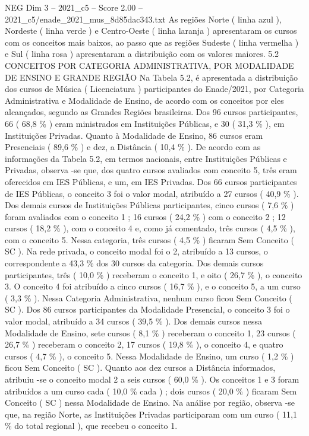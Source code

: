 \begin{textsample}{NEG Dim 3 – 2021\_c5 – Score 2.00 – 2021\_c5/enade\_2021\_mus\_8d85dac343.txt}
As regiões Norte ( linha azul ), Nordeste ( linha verde ) e Centro-Oeste ( linha laranja ) apresentaram os cursos com os conceitos mais baixos, ao passo que as regiões Sudeste ( linha vermelha ) e Sul ( linha rosa ) apresentaram a distribuição com os valores maiores. 5.2 CONCEITOS POR CATEGORIA ADMINISTRATIVA, POR MODALIDADE DE ENSINO E GRANDE REGIÃO Na Tabela 5.2, é apresentada a distribuição dos cursos de Música ( Licenciatura ) participantes do Enade/2021, por Categoria Administrativa e Modalidade de Ensino, de acordo com os conceitos por eles alcançados, segundo as Grandes Regiões brasileiras.
Dos 96 cursos participantes, 66 ( 68,8 \% ) eram ministrados em Instituições Públicas, e 30 ( 31,3 \% ), em Instituições Privadas.
Quanto à Modalidade de Ensino, 86 cursos eram Presenciais ( 89,6 \% ) e dez, a Distância ( 10,4 \% ).
De acordo com as informações da Tabela 5.2, em termos nacionais, entre Instituições Públicas e Privadas, observa -se que, dos quatro cursos avaliados com conceito 5, três eram oferecidos em IES Públicas, e um, em IES Privadas.
Dos 66 cursos participantes de IES Públicas, o conceito 3 foi o valor modal, atribuído a 27 cursos ( 40,9 \% ).
Dos demais cursos de Instituições Públicas participantes, cinco cursos ( 7,6 \% ) foram avaliados com o conceito 1 ; 16 cursos ( 24,2 \% ) com o conceito 2 ; 12 cursos ( 18,2 \% ), com o conceito 4 e, como já comentado, três cursos ( 4,5 \% ), com o conceito 5.
Nessa categoria, três cursos ( 4,5 \% ) ficaram Sem Conceito ( SC ).
Na rede privada, o conceito modal foi o 2, atribuído a 13 cursos, o correspondente a 43,3 \% dos 30 cursos da categoria.
Dos demais cursos participantes, três ( 10,0 \% ) receberam o conceito 1, e oito ( 26,7 \% ), o conceito 3.
O conceito 4 foi atribuído a cinco cursos ( 16,7 \% ), e o conceito 5, a um curso ( 3,3 \% ).
Nessa Categoria Administrativa, nenhum curso ficou Sem Conceito ( SC ).
Dos 86 cursos participantes da Modalidade Presencial, o conceito 3 foi o valor modal, atribuído a 34 cursos ( 39,5 \% ).
Dos demais cursos nessa Modalidade de Ensino, sete cursos ( 8,1 \% ) receberam o conceito 1, 23 cursos ( 26,7 \% ) receberam o conceito 2, 17 cursos ( 19,8 \% ), o conceito 4, e quatro cursos ( 4,7 \% ), o conceito 5.
Nessa Modalidade de Ensino, um curso ( 1,2 \% ) ficou Sem Conceito ( SC ).
Quanto aos dez cursos a Distância informados, atribuiu -se o conceito modal 2 a seis cursos ( 60,0 \% ).
Os conceitos 1 e 3 foram atribuídos a um curso cada ( 10,0 \% cada ) ; dois cursos ( 20,0 \% ) ficaram Sem Conceito ( SC ) nessa Modalidade de Ensino.
Na análise por região, observa -se que, na região Norte, as Instituições Privadas participaram com um curso ( 11,1 \% do total regional ), que recebeu o conceito 1.

\end{textsample}

